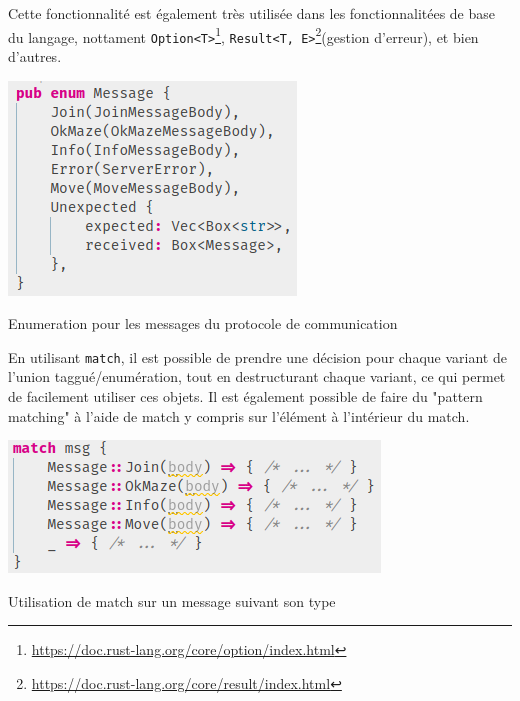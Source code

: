 \documentclass{EPUProjetDi}
\begin{document}
Cette fonctionnalité est également très utilisée dans les fonctionnalitées de base du langage, nottament \verb|Option<T>|\footnote{\url{https://doc.rust-lang.org/core/option/index.html}}, \verb|Result<T, E>|\footnote{\url{https://doc.rust-lang.org/core/result/index.html}}(gestion d'erreur), et bien d'autres.

\begin{center}
  \includegraphics[width=\linewidth/3]{EnumMessage.png}
  \label{fig:EnumMessage}

  Enumeration pour les messages du protocole de communication
\end{center}

En utilisant \verb|match|, il est possible de prendre une décision pour chaque variant de l'union taggué/enumération, tout en destructurant chaque variant, ce qui permet de facilement utiliser ces objets. Il est également possible de faire du "pattern matching" à l'aide de match y compris sur l'élément à l'intérieur du match.

\begin{center}
  \includegraphics[width=\linewidth/2]{MatchMessage.png}
  \label{fig:MatchMessage}

  Utilisation de match sur un message suivant son type
\end{center}
\end{document}
